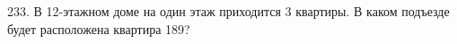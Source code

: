 233. В 12-этажном доме на один этаж  приходится 3 квартиры. В каком подъезде будет расположена квартира 189?\\
